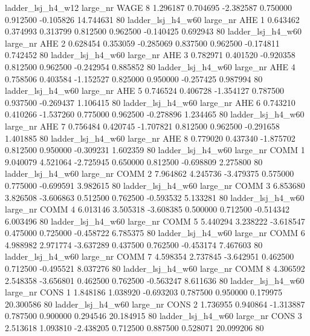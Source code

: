   ladder_lsj_h4_w12   large_nr     WAGE                 8  1.296187  0.704695  -2.382587 0.750000 0.912500 -0.105826   14.744631 80
  ladder_lsj_h4_w60   large_nr      AHE                 1  0.643462  0.374993   0.313799 0.812500 0.962500 -0.140425    0.692943 80
  ladder_lsj_h4_w60   large_nr      AHE                 2  0.628454  0.353059  -0.285069 0.837500 0.962500 -0.174811    0.742452 80
  ladder_lsj_h4_w60   large_nr      AHE                 3  0.782971  0.401520  -0.920358 0.812500 0.962500 -0.242954    0.885852 80
  ladder_lsj_h4_w60   large_nr      AHE                 4  0.758506  0.403584  -1.152527 0.825000 0.950000 -0.257425    0.987994 80
  ladder_lsj_h4_w60   large_nr      AHE                 5  0.746524  0.406728  -1.354127 0.787500 0.937500 -0.269437    1.106415 80
  ladder_lsj_h4_w60   large_nr      AHE                 6  0.743210  0.410266  -1.537260 0.775000 0.962500 -0.278896    1.234465 80
  ladder_lsj_h4_w60   large_nr      AHE                 7  0.756484  0.420745  -1.707821 0.812500 0.962500 -0.291658    1.401885 80
  ladder_lsj_h4_w60   large_nr      AHE                 8  0.779020  0.437340  -1.875702 0.812500 0.950000 -0.309231    1.602359 80
  ladder_lsj_h4_w60   large_nr     COMM                 1  9.040079  4.521064  -2.725945 0.650000 0.812500 -0.698809    2.275800 80
  ladder_lsj_h4_w60   large_nr     COMM                 2  7.964862  4.245736  -3.479375 0.575000 0.775000 -0.699591    3.982615 80
  ladder_lsj_h4_w60   large_nr     COMM                 3  6.853680  3.826508  -3.606863 0.512500 0.762500 -0.593532    5.133281 80
  ladder_lsj_h4_w60   large_nr     COMM                 4  6.013146  3.505318  -3.608385 0.500000 0.712500 -0.514342    6.003496 80
  ladder_lsj_h4_w60   large_nr     COMM                 5  5.440294  3.238222  -3.618547 0.475000 0.725000 -0.458722    6.785375 80
  ladder_lsj_h4_w60   large_nr     COMM                 6  4.988982  2.971774  -3.637289 0.437500 0.762500 -0.453174    7.467603 80
  ladder_lsj_h4_w60   large_nr     COMM                 7  4.598354  2.737845  -3.642951 0.462500 0.712500 -0.495521    8.037276 80
  ladder_lsj_h4_w60   large_nr     COMM                 8  4.306592  2.548358  -3.656801 0.462500 0.762500 -0.563247    8.611636 80
  ladder_lsj_h4_w60   large_nr     CONS                 1  1.848186  1.038920  -0.693203 0.787500 0.950000  0.179975   20.300586 80
  ladder_lsj_h4_w60   large_nr     CONS                 2  1.736955  0.940864  -1.313887 0.787500 0.900000  0.294546   20.184915 80
  ladder_lsj_h4_w60   large_nr     CONS                 3  2.513618  1.093810  -2.438205 0.712500 0.887500  0.528071   20.099206 80

